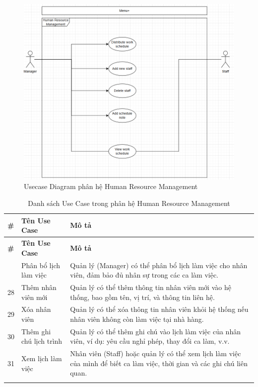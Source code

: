         \begin{figure}[H]
	\centering
	\includegraphics[width=\linewidth]{Images/ucd-hrm.png}
	\caption{Usecase Diagram phân hệ Human Resource Management}
        \end{figure}

        \begin{longtable}{|p{1cm}|p{5cm}|p{9cm}|}
        \hline
        \textbf{\#} & \textbf{Tên Use Case} & \textbf{Mô tả} \\ 
        \hline
        \endfirsthead
        \hline
        \textbf{\#} & \textbf{Tên Use Case} & \textbf{Mô tả} \\ 
        \endhead
        \hline
        \endfoot
        \hline
        \endlastfoot
        27 & Phân bổ lịch làm việc & Quản lý (Manager) có thể phân bổ lịch làm việc cho nhân viên, đảm bảo đủ nhân sự trong các ca làm việc. \\ 
        \hline
        28 & Thêm nhân viên mới & Quản lý có thể thêm thông tin nhân viên mới vào hệ thống, bao gồm tên, vị trí, và thông tin liên hệ. \\ 
        \hline
        29 & Xóa nhân viên & Quản lý có thể xóa thông tin nhân viên khỏi hệ thống nếu nhân viên không còn làm việc tại nhà hàng. \\ 
        \hline
        30 & Thêm ghi chú lịch trình & Quản lý có thể thêm ghi chú vào lịch làm việc của nhân viên, ví dụ: yêu cầu nghỉ phép, thay đổi ca làm, v.v. \\ 
        \hline
        31 & Xem lịch làm việc & Nhân viên (Staff) hoặc quản lý có thể xem lịch làm việc của mình để biết ca làm việc, thời gian và các ghi chú liên quan. \\ 
        \hline
        \caption{Danh sách Use Case trong phân hệ Human Resource Management}\\
        \end{longtable}

